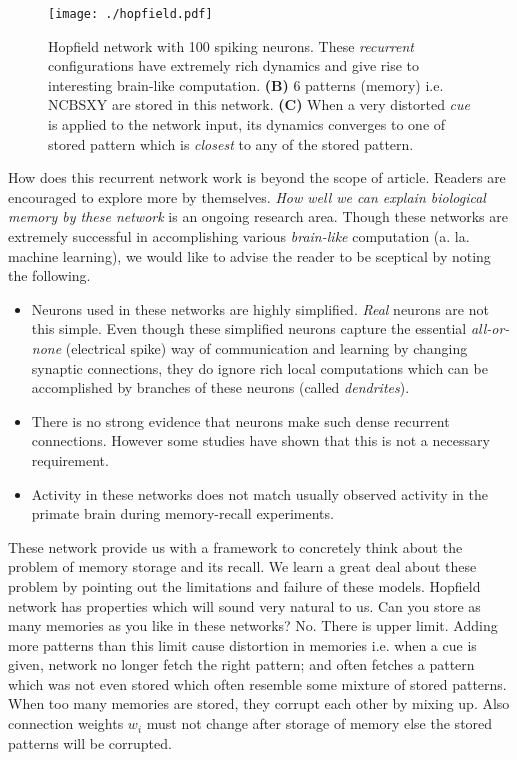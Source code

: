 \documentclass[]{resonance}
\begin{document}
{\begin{figure}[!hb]
    \centering
    \caption{Hopfield network with 100 spiking neurons. These \emph{recurrent} configurations have 
        extremely rich dynamics and give rise to interesting brain-like
        computation. \textbf{(B)} 6 patterns (memory) i.e. NCBSXY are stored in this
        network. \textbf{(C)} When a very distorted \textit{cue} is applied to
        the network input, its dynamics converges to one of stored pattern which
        is \emph{closest} to any of the stored pattern.
    }\label{fig:hopfield}
    \texttt{[image: ./hopfield.pdf]}
\end{figure}

How does this recurrent network work is beyond the scope of article. Readers are
encouraged to explore more by themselves. \emph{How well we can explain
biological memory by these network} is an ongoing research area. Though these
networks are extremely successful in accomplishing various \textit{brain-like}
computation (a. la. machine learning), we would like to advise the reader to be
sceptical by noting the following.

\begin{itemize}
    \item  Neurons used in these networks are highly simplified. \textit{Real}
        neurons are not this simple. Even though these simplified neurons
        capture the essential \textit{all-or-none} (electrical spike) way of
        communication and learning by changing synaptic connections, they do
        ignore rich local computations which can be accomplished by branches of
        these neurons (called \textit{dendrites}).
    \item  There is no strong evidence that neurons make such dense recurrent
        connections. However some studies have shown that this is not a
        necessary requirement.
    \item Activity in these networks does not match usually observed activity 
        in the primate brain during memory-recall experiments.
\end{itemize}

 These network provide us with a framework to
concretely think about the problem of memory storage and its recall. We learn a
great deal about these problem by pointing out the limitations and failure of
these models. Hopfield network has properties which will sound very natural to
us. Can you store as many memories as you like in these networks? No. There is
upper limit. Adding more patterns than this limit cause distortion in memories
i.e. when a cue is given, network no longer fetch the right pattern; and often
fetches a pattern which was not even stored which often resemble some mixture of
stored patterns. When too many memories are stored, they corrupt each other by
mixing up. Also connection weights $w_i$ must not change after storage of memory
else the stored patterns will be corrupted.

}
\end{document}
